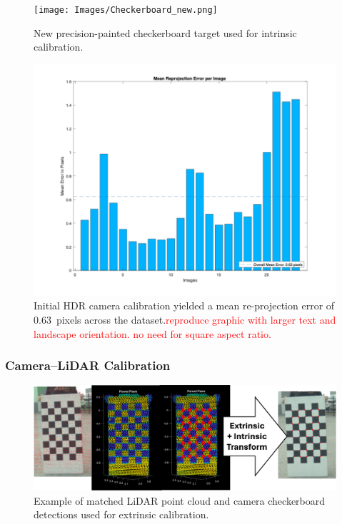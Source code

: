 \documentclass{erauthesis}
\begin{document}
\begin{figure}[htbp]
    \centering
    \texttt{[image: Images/Checkerboard\_new.png]}
    \caption{New precision-painted checkerboard target used for intrinsic calibration.}
    \label{fig:checkerboard_new}
\end{figure}

\begin{figure}[htbp]
    \centering
    \includegraphics[width=0.9\linewidth]{Images/HDR_calib_error.png}
    \caption{Initial HDR camera calibration yielded a mean re-projection error of 0.63~pixels across the dataset.\textcolor{red}{reproduce graphic with larger text and landscape orientation. no need for square aspect ratio.}}
    \label{fig:HDR_calib_error}
\end{figure}

\subsubsection{Camera–LiDAR Calibration} \label{sec:camera-lidar_results}


\begin{figure}[htbp]
    \centering
    \includegraphics[width=0.8\linewidth]{Images/calib_checkers.png}
    \caption{Example of matched LiDAR point cloud and camera checkerboard detections used for extrinsic calibration.}
    \label{fig:calib_check}
\end{figure}
\end{document}
